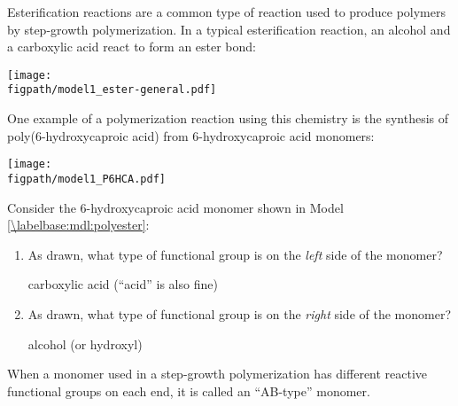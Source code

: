 \begin{activity}
\begin{instructornotes}
\end{instructornotes}


\begin{model}
\label{\labelbase:mdl:polyester}

	Esterification reactions are a common type of reaction used to produce polymers by step-growth polymerization.
	In a typical esterification reaction, an alcohol and a carboxylic acid react to form an ester bond:
	
	\centerline{\texttt{[image: \\figpath/model1\_ester-general.pdf]}}
	
	One example of a polymerization reaction using this chemistry is the synthesis of poly(6-hydroxycaproic acid) from 6-hydroxycaproic acid monomers:
	
	\centerline{\texttt{[image: \\figpath/model1\_P6HCA.pdf]}}

\end{model}


\begin{ctqs}

	\question Consider the 6-hydroxycaproic acid monomer shown in Model \ref{\labelbase:mdl:polyester}: \label{\labelbase:ctq:label-6hcpa}
	
		\begin{enumerate}
			\item As drawn, what type of functional group is on the \emph{left} side of the monomer?
			
				\begin{solution}[1in]
					carboxylic acid (``acid'' is also fine)
				\end{solution}
			
			\item As drawn, what type of functional group is on the \emph{right} side of the monomer?
			
				\begin{solution}[1in]
					alcohol (or hydroxyl)
				\end{solution}
		\end{enumerate}
		
\end{ctqs}

\begin{infobox}

	When a monomer used in a step-growth polymerization has different reactive functional groups on each end, it is called an ``AB-type'' monomer.
	

\end{infobox}
\end{activity}
